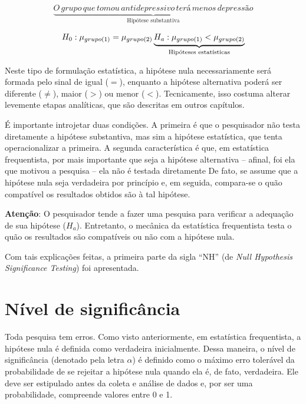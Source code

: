 \documentclass[
]{book}
\newenvironment{warning}{
  \definecolor{shadecolor}{rgb}{0, 0, 0}  %
  \color{white}
  \begin{shaded}}
 {\end{shaded}}
\begin{document}
\[\underbrace{O \,grupo \,que \,tomou \,antidepressivo \,terá \,menos \,depressão}_\text{Hipótese  substantiva}\]

\[H_0: \mu_{grupo (1)} = \mu_{grupo (2)} \\ \underbrace{H_a: \mu_{grupo (1)} < \mu_{grupo (2)}}_\text{Hipóteses estatísticas}\]

Neste tipo de formulação estatística, a hipótese nula necessariamente será formada pelo sinal de igual (\(=\)), enquanto a hipótese alternativa poderá ser diferente (\(\neq\)), maior (\(>\)) ou menor (\(<\)). Tecnicamente, isso costuma alterar levemente etapas analíticas, que são descritas em outros capítulos.

É importante introjetar duas condições. A primeira é que o pesquisador não testa diretamente a hipótese substantiva, mas sim a hipótese estatística, que tenta operacionalizar a primeira. A segunda característica é que, em estatística frequentista, por mais importante que seja a hipótese alternativa -- afinal, foi ela que motivou a pesquisa -- ela não é testada diretamente De fato, se assume que a hipótese nula seja verdadeira por princípio e, em seguida, compara-se o quão compatível os resultados obtidos são à tal hipótese.

\begin{warning}

\textbf{Atenção}: O pesquisador tende a fazer uma pesquisa para verificar a adequação de sua hipótese (\(H_a\)). Entretanto, o mecânica da estatística frequentista testa o quão os resultados são compatíveis ou não com a hipótese nula.

\end{warning}

Com tais explicações feitas, a primeira parte da sigla ``NH'' (de \emph{Null Hypothesis Significance Testing}) foi apresentada.

\hypertarget{nuxedvel-de-significuxe2ncia}{%
\section{Nível de significância}\label{nuxedvel-de-significuxe2ncia}}

Toda pesquisa tem erros. Como visto anteriormente, em estatística frequentista, a hipótese nula é definida como verdadeira inicialmente. Dessa maneira, o nível de significância (denotado pela letra \(\alpha\)) é definido como o máximo erro tolerável \citep{Greenland2019} da probabilidade de se rejeitar a hipótese nula quando ela é, de fato, verdadeira. Ele deve ser estipulado antes da coleta e análise de dados e, por ser uma probabilidade, compreende valores entre 0 e 1.
\end{document}
